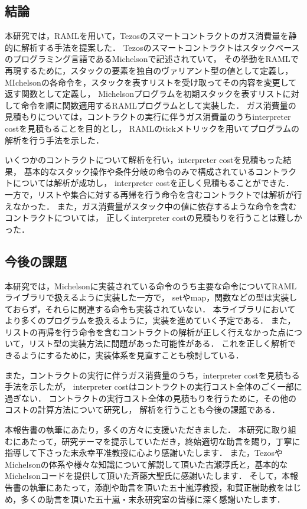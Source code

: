 \documentclass{kuisthesis}
\begin{document}
\subsection{結論} \label{subsec-conclusion-conclusion}
本研究では，RAMLを用いて，Tezosのスマートコントラクトのガス消費量を静的に解析する手法を提案した．
Tezosのスマートコントラクトはスタックベースのプログラミング言語であるMichelsonで記述されていて，
その挙動をRAMLで再現するために，スタックの要素を独自のヴァリアント型の値として定義し，
MIchelsonの各命令を，スタックを表すリストを受け取ってその内容を変更して返す関数として定義し，
Michelsonプログラムを初期スタックを表すリストに対して命令を順に関数適用するRAMLプログラムとして実装した．
ガス消費量の見積もりについては，コントラクトの実行に伴うガス消費量のうちinterpreter costを見積もることを目的とし，
RAMLのtickメトリックを用いてプログラムの解析を行う手法を示した．

いくつかのコントラクトについて解析を行い，interpreter costを見積もった結果，
基本的なスタック操作や条件分岐の命令のみで構成されているコントラクトについては解析が成功し，
interpreter costを正しく見積もることができた．
一方で，リストや集合に対する再帰を行う命令を含むコントラクトでは解析が行えなかった．
また，ガス消費量がスタック中の値に依存するような命令を含むコントラクトについては，
正しくinterpreter costの見積もりを行うことは難しかった．

\subsection{今後の課題} \label{subsec-conclusion-work}
本研究では，Michelsonに実装されている命令のうち主要な命令についてRAMLライブラリで扱えるように実装した一方で，
setやmap，関数などの型は実装しておらず，それらに関連する命令も実装されていない．
本ライブラリにおいてより多くのプログラムを扱えるように，実装を進めていく予定である．
また，リストの再帰を行う命令を含むコントラクトの解析が正しく行えなかった点について，リスト型の実装方法に問題があった可能性がある．
これを正しく解析できるようにするために，実装体系を見直すことも検討している．

また，コントラクトの実行に伴うガス消費量のうち，interpreter costを見積もる手法を示したが，
interpreter costはコントラクトの実行コスト全体のごく一部に過ぎない．
コントラクトの実行コスト全体の見積もりを行うために，その他のコストの計算方法について研究し，
解析を行うことも今後の課題である．


\acknowledgments
本報告書の執筆にあたり，多くの方々に支援いただきました．
本研究に取り組むにあたって，研究テーマを提示していただき，終始適切な助言を賜り，丁寧に指導して下さった末永幸平准教授に心より感謝いたします．
また，TezosやMichelsonの体系や様々な知識について解説して頂いた古瀬淳氏と，基本的なMichelsonコードを提供して頂いた斉藤大聖氏に感謝いたします．
そして，本報告書の執筆にあたって，添削や助言を頂いた五十嵐淳教授，和賀正樹助教をはじめ，多くの助言を頂いた五十嵐・末永研究室の皆様に深く感謝いたします．

\nocite{*}


\end{document}
